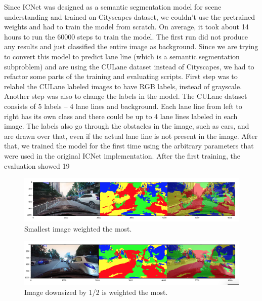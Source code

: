 \documentclass[twoside,twocolumn]{article}
\begin{document}
\par Since ICNet was designed as a semantic segmentation model for scene understanding and trained on Cityscapes dataset, we couldn't use the pretrained weights and had to train the model from scratch. On average, it took about 14 hours to run the 60000 steps to train the model. The first run did not produce any results and just classified the entire image as background. Since we are trying to convert this model to predict lane line (which is a semantic segmentation subproblem) and are using the CULane dataset instead of Cityscapes, we had to refactor some parts of the training and evaluating scripts. First step was to relabel the CULane labeled images to have RGB labels, instead of grayscale. Another step was also to change the labels in the model. The CULane dataset consists of 5 labels -- 4 lane lines and background. Each lane line from left to right has its own class and there could be up to 4 lane lines labeled in each image. The labels also go through the obstacles in the image, such as cars, and are drawn over that, even if the actual lane line is not present in the image.  After that, we trained the model for the first time using the arbitrary parameters that were used in the original ICNet implementation. After the first training, the evaluation showed 19%

\begin{figure}
  \includegraphics[width=\linewidth]{2.png}
  \caption{Smallest image weighted the most.}
  \label{fig:weights1}
\end{figure}

\begin{figure}
  \includegraphics[width=\linewidth]{3.png}
  \caption{Image downsized by 1/2 is weighted the most.}
  \label{fig:weights2}
\end{figure}
\end{document}
